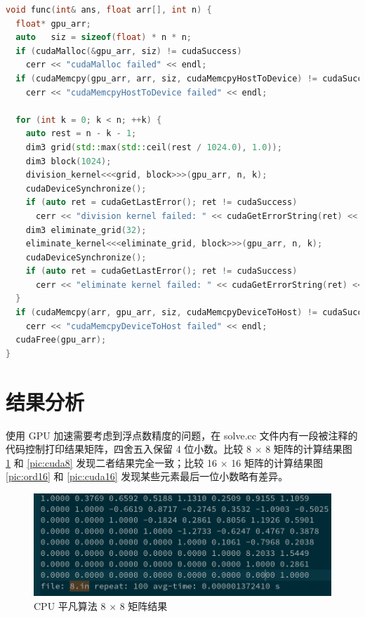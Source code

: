 \documentclass[a4paper]{article}
\begin{document}
\begin{lstlisting}[frame=trbl,language={C++}]
void func(int& ans, float arr[], int n) {
  float* gpu_arr;
  auto   siz = sizeof(float) * n * n;
  if (cudaMalloc(&gpu_arr, siz) != cudaSuccess)
    cerr << "cudaMalloc failed" << endl;
  if (cudaMemcpy(gpu_arr, arr, siz, cudaMemcpyHostToDevice) != cudaSuccess)
    cerr << "cudaMemcpyHostToDevice failed" << endl;

  for (int k = 0; k < n; ++k) {
    auto rest = n - k - 1;
    dim3 grid(std::max(std::ceil(rest / 1024.0), 1.0));
    dim3 block(1024);
    division_kernel<<<grid, block>>>(gpu_arr, n, k);
    cudaDeviceSynchronize();
    if (auto ret = cudaGetLastError(); ret != cudaSuccess)
      cerr << "division kernel failed: " << cudaGetErrorString(ret) << endl;
    dim3 eliminate_grid(32);
    eliminate_kernel<<<eliminate_grid, block>>>(gpu_arr, n, k);
    cudaDeviceSynchronize();
    if (auto ret = cudaGetLastError(); ret != cudaSuccess)
      cerr << "eliminate kernel failed: " << cudaGetErrorString(ret) << endl;
  }
  if (cudaMemcpy(arr, gpu_arr, siz, cudaMemcpyDeviceToHost) != cudaSuccess)
    cerr << "cudaMemcpyDeviceToHost failed" << endl;
  cudaFree(gpu_arr);
}
\end{lstlisting}

\section{结果分析}

使用 GPU 加速需要考虑到浮点数精度的问题，在 solve.cc 文件内有一段被注释的代码控制打印结果矩阵，四舍五入保留 4 位小数。比较 8 × 8 矩阵的计算结果图 \ref{pic:ord8} 和 \ref{pic:cuda8} 发现二者结果完全一致；比较 16 × 16 矩阵的计算结果图 \ref{pic:ord16} 和 \ref{pic:cuda16} 发现某些元素最后一位小数略有差异。

\begin{figure}[h]
  \centering
  \includegraphics[width=\textwidth]{ord8.png}
  \caption{CPU 平凡算法 8 × 8 矩阵结果}
  \label{pic:ord8}
\end{figure}
\end{document}
